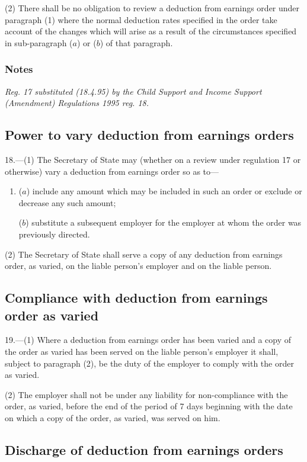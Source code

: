 \documentclass[a4paper]{article}
\newcommand\amendment[1]{\subsubsection*{Notes}{\itshape\frenchspacing\footnotesize #1 \par}}
\begin{document}
(2) There shall be no obligation to review a deduction from earnings order under paragraph (1) where the normal deduction rates specified in the order take account of the changes which will arise as a result of the circumstances specified in sub-paragraph ($a$) or ($b$) of that paragraph.

\amendment{
Reg. 17 substituted (18.4.95) by the Child Support and Income Support (Amendment) Regulations 1995 reg. 18.
}

\subsection[18. Power to vary deduction from earnings orders]{Power to vary deduction from earnings orders}

18.—(1) The Secretary of State may (whether on a review under regulation 17 or otherwise) vary a deduction from earnings order so as to—
\begin{enumerate}\item[]
($a$) include any amount which may be included in such an order or exclude or decrease any such amount;

($b$) substitute a subsequent employer for the employer at whom the order was previously directed.
\end{enumerate}

(2) The Secretary of State shall serve a copy of any deduction from earnings order, as varied, on the liable person’s employer and on the liable person.

\subsection[19. Compliance with deduction from earnings order as varied]{Compliance with deduction from earnings order as varied}

19.—(1) Where a deduction from earnings order has been varied and a copy of the order as varied has been served on the liable person’s employer it shall, subject to paragraph (2), be the duty of the employer to comply with the order as varied.

(2) The employer shall not be under any liability for non-compliance with the order, as varied, before the end of the period of 7 days beginning with the date on which a copy of the order, as varied, was served on him.

\subsection[20. Discharge of deduction from earnings orders]{Discharge of deduction from earnings orders}
\end{document}
